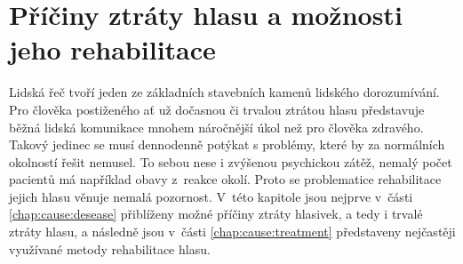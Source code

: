 \chapter{Příčiny ztráty hlasu a možnosti jeho rehabilitace}
\label{chap:cause}

Lidská řeč tvoří jeden ze základních stavebních kamenů lidského dorozumívání. Pro člověka
postiženého ať už dočasnou či trvalou ztrátou hlasu představuje běžná lidská
komunikace mnohem náročnější úkol než pro člověka zdravého. Takový jedinec se
musí dennodenně potýkat s problémy, které by za normálních okolností řešit
nemusel. To sebou nese %
i zvýšenou psychickou zátěž, nemalý počet pacientů má například obavy %
z~reakce okolí. Proto se problematice rehabilitace jejich
hlasu věnuje nemalá pozornost. V~této kapitole jsou nejprve v~části
\ref{chap:cause:desease} přiblíženy možné příčiny ztráty hlasivek, a tedy i
trvalé ztráty hlasu, a následně jsou v~části \ref{chap:cause:treatment} představeny
nejčastěji využívané metody rehabilitace hlasu.



% 
% 
